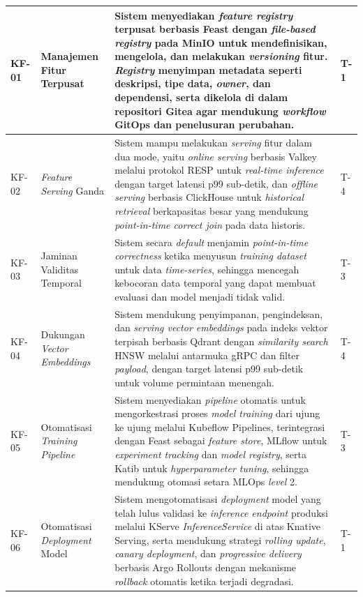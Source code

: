 {\begin{longtable}{|>{\centering\arraybackslash}m{0.75cm}|m{2cm}|m{8.55cm}|>{\centering\arraybackslash}m{1.75cm}|}
KF-01 & Manajemen Fitur Terpusat & Sistem menyediakan \textit{feature registry} terpusat berbasis Feast dengan \textit{file-based registry} pada MinIO untuk mendefinisikan, mengelola, dan melakukan \textit{versioning} fitur. \textit{Registry} menyimpan metadata seperti deskripsi, tipe data, \textit{owner}, dan dependensi, serta dikelola di dalam repositori Gitea agar mendukung \textit{workflow} GitOps dan penelusuran perubahan. & T-1 \\
\hline
KF-02 & \textit{Feature Serving} Ganda & Sistem mampu melakukan \textit{serving} fitur dalam dua mode, yaitu \textit{online serving} berbasis Valkey melalui protokol RESP untuk \textit{real-time inference} dengan target latensi p99 sub-detik, dan \textit{offline serving} berbasis ClickHouse untuk \textit{historical retrieval} berkapasitas besar yang mendukung \textit{point-in-time correct join} pada data historis. & T-4 \\
\hline
KF-03 & Jaminan Validitas Temporal & Sistem secara \textit{default} menjamin \textit{point-in-time correctness} ketika menyusun \textit{training dataset} untuk data \textit{time-series}, sehingga mencegah kebocoran data temporal yang dapat membuat evaluasi dan model menjadi tidak valid. & T-3 \\
\hline
KF-04 & Dukungan \textit{Vector Embeddings} & Sistem mendukung penyimpanan, pengindeksan, dan \textit{serving vector embeddings} pada indeks vektor terpisah berbasis Qdrant dengan \textit{similarity search} HNSW melalui antarmuka gRPC dan filter \textit{payload}, dengan target latensi p99 sub-detik untuk volume permintaan menengah. & T-4 \\
\hline
KF-05 & Otomatisasi \textit{Training Pipeline} & Sistem menyediakan \textit{pipeline} otomatis untuk mengorkestrasi proses \textit{model training} dari ujung ke ujung melalui Kubeflow Pipelines, terintegrasi dengan Feast sebagai \textit{feature store}, MLflow untuk \textit{experiment tracking} dan \textit{model registry}, serta Katib untuk \textit{hyperparameter tuning}, sehingga mendukung otomasi setara MLOps \textit{level} 2. & T-3 \\
\hline
KF-06 & Otomatisasi \textit{Deployment} Model & Sistem mengotomatisasi \textit{deployment} model yang telah lulus validasi ke \textit{inference endpoint} produksi melalui KServe \textit{InferenceService} di atas Knative Serving, serta mendukung strategi \textit{rolling update}, \textit{canary deployment}, dan \textit{progressive delivery} berbasis Argo Rollouts dengan mekanisme \textit{rollback} otomatis ketika terjadi degradasi. & T-1 \\

\end{longtable}}
